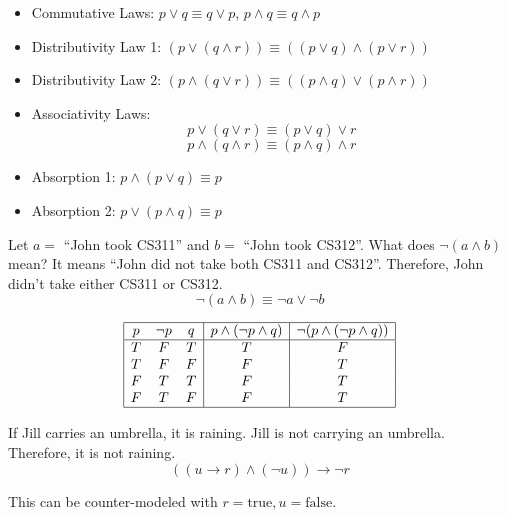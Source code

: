 \documentclass{scrreprt}
\newcommand{\true}{\text{true}}
\newcommand{\false}{\text{false}}
\begin{document}
\begin{note}
	\begin{itemize}
		\item Commutative Laws: $p\lor q \equiv q\lor p$, $p\land q \equiv q\land p$
		\item Distributivity Law 1: $(p\lor (q\land r)) \equiv ((p\lor q)\land (p\lor r))$
		\item Distributivity Law 2: $(p\land (q\lor r)) \equiv ((p\land q)\lor (p\land r))$
		\item Associativity Laws: \[
			      p\lor (q\lor r) \equiv (p\lor q)\lor r \]
		      \[ p\land (q\land r)\equiv (p\land q)\land r \]
		\item Absorption 1: $p\land (p\lor q) \equiv p$
		\item Absorption 2: $p\lor (p\land q) \equiv p$
	\end{itemize}
\end{note}

\begin{definition}
	Let $a=$ ``John took CS311'' and $b=$ ``John took CS312''. What does
	$\neg (a\land b)$ mean? It means ``John did not take both CS311 and CS312''.
	Therefore, John didn't take either CS311 or CS312.
	\[
		\neg(a\land b) \equiv \neg a\lor \neg b
	\]
\end{definition}

\begin{example}
	\[
		\begin{array}{|c c c|c|c|}
			\hline
			p & \neg p & q & p\land (\neg p\land q) & \neg (p\land (\neg p\land q)) \\
			\hline
			T & F      & T & T                      & F                             \\
			T & F      & F & F                      & T                             \\
			F & T      & T & F                      & T                             \\
			F & T      & F & F                      & T                             \\
			\hline
		\end{array}
	\]
\end{example}

\begin{example}
	If Jill carries an umbrella, it is raining. Jill is not carrying an umbrella. Therefore, it is not raining.
	\[
		((u\rightarrow r)\land (\neg u))\rightarrow \neg r
	\]

	This can be counter-modeled with $r=\true, u=\false$.
\end{example}
\end{document}
